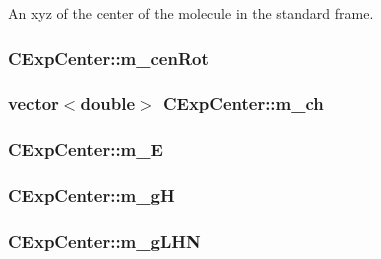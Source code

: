 An xyz of the center of the molecule in the standard frame. 

\hypertarget{classCExpCenter_a73b0d497d54258b3ab503167ae6f7e75}{
\subsubsection[{m\-\_\-cen\-Rot}]{ C\-Exp\-Center\-::m\-\_\-cen\-Rot\hspace{0.3cm}{\ttfamily [protected]}}}\label{classCExpCenter_a73b0d497d54258b3ab503167ae6f7e75}
\hypertarget{classCExpCenter_a834cd8238e3d5fd2b29a487d08f93978}{
\subsubsection[{m\-\_\-ch}]{\setlength{\rightskip}{0pt plus 5cm}vector$<$double$>$ C\-Exp\-Center\-::m\-\_\-ch\hspace{0.3cm}{\ttfamily [protected]}}}\label{classCExpCenter_a834cd8238e3d5fd2b29a487d08f93978}
\hypertarget{classCExpCenter_a41728832a9a82eec510548f438e65734}{
\subsubsection[{m\-\_\-\-E}]{ C\-Exp\-Center\-::m\-\_\-\-E\hspace{0.3cm}{\ttfamily [protected]}}}\label{classCExpCenter_a41728832a9a82eec510548f438e65734}
\hypertarget{classCExpCenter_ae860d91bb83f5b31eff56694f6428e20}{
\subsubsection[{m\-\_\-g\-H}]{ C\-Exp\-Center\-::m\-\_\-g\-H\hspace{0.3cm}{\ttfamily [protected]}}}\label{classCExpCenter_ae860d91bb83f5b31eff56694f6428e20}
\hypertarget{classCExpCenter_a2ac196fbf3b2a5623553b4ecdc30cd7f}{
\subsubsection[{m\-\_\-g\-L\-H\-N}]{ C\-Exp\-Center\-::m\-\_\-g\-L\-H\-N\hspace{0.3cm}{\ttfamily [protected]}}}\label{classCExpCenter_a2ac196fbf3b2a5623553b4ecdc30cd7f}

